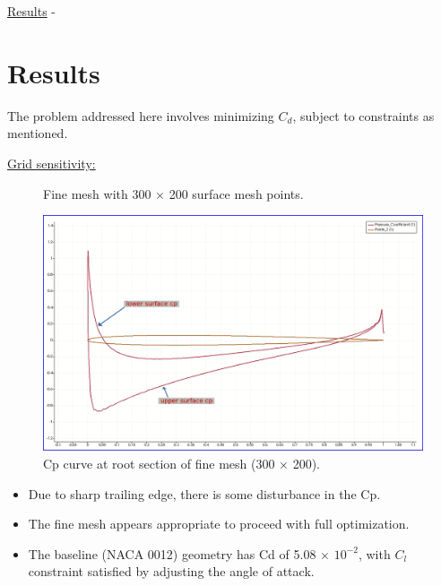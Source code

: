 \begin{frame}[allowframebreaks]{\underline{Results} -}
    \section{Results}
The problem addressed here involves minimizing $C_d$, subject to constraints as mentioned.


\underline{Grid sensitivity:}


\parbox{0.57\linewidth}{
\begin{figure} 
    \centering
    \caption{Fine mesh with 300 $\times$ 200 surface mesh points.}
    \label{fine_mesh}
\end{figure}
}
\parbox{0.37\linewidth}{
\begin{figure} 
    \centering
    \includegraphics[scale = 0.08]{figures/cp_curve.png}
    \caption{Cp curve at root section of fine mesh (300 $\times$ 200).}
    \label{cp curve}
\end{figure}
}
\begin{itemize}
\item Due to sharp trailing edge, there is some disturbance in the Cp.
\item The fine mesh appears appropriate to proceed with full optimization.
\item The baseline (NACA 0012) geometry has Cd of 5.08 $\times$ $10^{-2}$, with $C_l$ constraint satisfied by adjusting
the angle of attack.
\end{itemize}


\end{frame}

